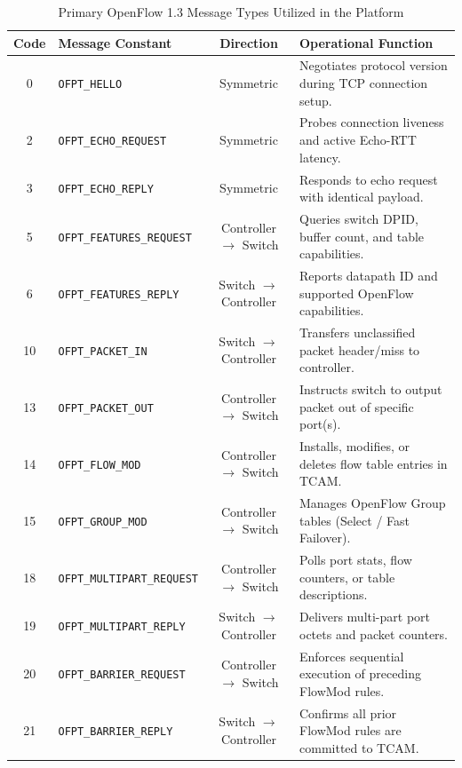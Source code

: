 \documentclass[12pt,a4paper,oneside]{report}
\begin{document}
\begin{table}[htbp]
\centering
\caption{Primary OpenFlow 1.3 Message Types Utilized in the Platform}
\label{tab:ofp_types_enumeration}
\small
\begin{tabularx}{\textwidth}{c l c X}
\toprule
\textbf{Code} & \textbf{Message Constant} & \textbf{Direction} & \textbf{Operational Function} \\
\midrule
0 & \texttt{OFPT\_HELLO} & Symmetric & Negotiates protocol version during TCP connection setup. \\
2 & \texttt{OFPT\_ECHO\_REQUEST} & Symmetric & Probes connection liveness and active Echo-RTT latency. \\
3 & \texttt{OFPT\_ECHO\_REPLY} & Symmetric & Responds to echo request with identical payload. \\
5 & \texttt{OFPT\_FEATURES\_REQUEST} & Controller $\to$ Switch & Queries switch DPID, buffer count, and table capabilities. \\
6 & \texttt{OFPT\_FEATURES\_REPLY} & Switch $\to$ Controller & Reports datapath ID and supported OpenFlow capabilities. \\
10 & \texttt{OFPT\_PACKET\_IN} & Switch $\to$ Controller & Transfers unclassified packet header/miss to controller. \\
13 & \texttt{OFPT\_PACKET\_OUT} & Controller $\to$ Switch & Instructs switch to output packet out of specific port(s). \\
14 & \texttt{OFPT\_FLOW\_MOD} & Controller $\to$ Switch & Installs, modifies, or deletes flow table entries in TCAM. \\
15 & \texttt{OFPT\_GROUP\_MOD} & Controller $\to$ Switch & Manages OpenFlow Group tables (Select / Fast Failover). \\
18 & \texttt{OFPT\_MULTIPART\_REQUEST} & Controller $\to$ Switch & Polls port stats, flow counters, or table descriptions. \\
19 & \texttt{OFPT\_MULTIPART\_REPLY} & Switch $\to$ Controller & Delivers multi-part port octets and packet counters. \\
20 & \texttt{OFPT\_BARRIER\_REQUEST} & Controller $\to$ Switch & Enforces sequential execution of preceding FlowMod rules. \\
21 & \texttt{OFPT\_BARRIER\_REPLY} & Switch $\to$ Controller & Confirms all prior FlowMod rules are committed to TCAM. \\
\bottomrule
\end{tabularx}
\end{table}
\end{document}

